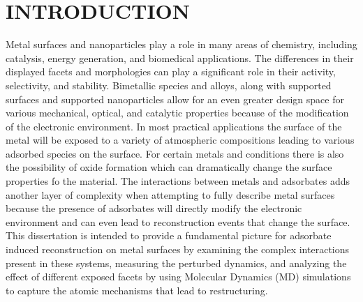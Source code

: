 %

\chapter{INTRODUCTION}
Metal surfaces and nanoparticles play a role in many areas of chemistry,
including catalysis\citep{}, energy generation\citep{}, and biomedical
applications.\citep{Padmos:0qf} The differences in their displayed facets and
morphologies can play a significant role in their activity\citep{},
selectivity\citep{}, and stability\citep{Zhang:2015ys, Zhang:2007uq}. Bimetallic species and
alloys\citep{}, along with supported surfaces and supported
nanoparticles\citep{} allow for an even greater design space for various
mechanical\citep{Cao:2010gf, Huang:2012ul}, optical\citep{}, and catalytic properties\citep{Han:0qr} because
of the modification of the electronic environment.  In most practical
applications the surface of the metal will be exposed to a variety of
atmospheric compositions leading to various adsorbed species on the surface.
For certain metals and conditions there is also the possibility of oxide
formation which can dramatically change the surface properties fo the
material.\citep{Derouin:2015kx} The interactions between metals and adsorbates adds another
layer of complexity when attempting to fully describe metal surfaces because
the presence of adsorbates will directly modify the electronic environment and
can even lead to reconstruction events that change the surface.\citep{Tao:2010aa, Tao:2008aa, Kim:2013mi} This
dissertation is intended to provide a fundamental picture for adsorbate induced
reconstruction on metal surfaces by examining the complex interactions present
in these systems, measuring the perturbed dynamics, and analyzing the effect of
different exposed facets by using Molecular Dynamics (MD) simulations to
capture the atomic mechanisms that lead to restructuring.



